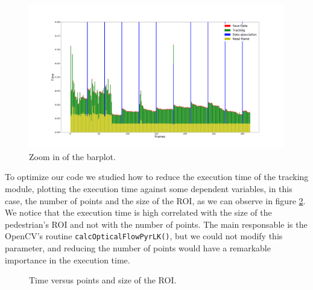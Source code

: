 \documentclass[12pt, a4paper, titlepage,twoside,openright]{article}
\begin{document}
\begin{figure}[H]
\centering         
\includegraphics[width=0.9\linewidth]{graphicsRearrange/temps/timeSpecfici.png}
\caption{Zoom in of the barplot.} \label{timing2}
\end{figure}

To optimize our code we studied how to reduce the execution time of the tracking module, plotting the execution time against some dependent variables, in this case, the number of points and the size of the ROI, as we can observe in figure \ref{timing2}. We notice that the execution time is high correlated with the size of the pedestrian's ROI and not with the number of points. The main responsable is the OpenCV's routine \texttt{calcOpticalFlowPyrLK()}, but we could not modify this parameter, and reducing the number of points would have a remarkable importance in the execution time. 



\begin{figure}[H]
		
\centering

\caption{Time versus points and size of the ROI.}
\label{timing2}
\end{figure}
\end{document}
